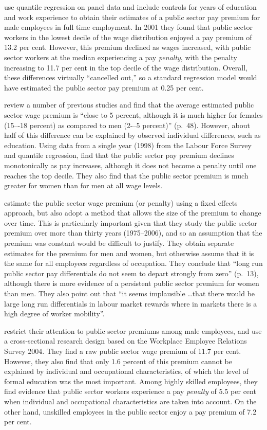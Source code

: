\documentclass[a4paper,11pt,titlepage]{article}
\begin{document}
\citet{Yu2005} use quantile regression on panel data and include controls for years of education and work experience to obtain their estimates of a public sector pay premium for male employees in full time employment.  In 2001 they found that public sector workers in the lowest decile of the wage distribution enjoyed a pay premium of 13.2 per cent.  However, this premium declined as wages increased, with public sector workers at the median experiencing a pay \emph{penalty}, with the penalty increasing to 11.7 per cent in the top decile of the wage distribution.  Overall, these differences virtually ``cancelled out,'' so a standard regression model would have estimated the public sector pay premium at 0.25 per cent.

\citet{Luciflora2006} review a number of previous studies and find that the average estimated public sector wage premium is ``close to 5 percent, although  it  is  much  higher  for  females  (15–-18  percent)  as  compared  to
men (2-–5 percent)'' (p.~48).  However, about half of this difference can be explained by observed individual differences, such as education.   Using data from a single year (1998) from the Labour Force Survey and quantile regression, \citet{Luciflora2006} find that the public sector pay premium declines monotonically as pay increases, although it does not become a penalty until one reaches the top decile.  They also find that the public sector premium is much greater for women than for men at all wage levels.

\citet{Disney2008} estimate the public sector wage premium (or penalty) using a fixed effects approach, but also adopt a method that allows the size of the premium to change over time.  This is particularly important given that they study the public sector premium over more than thirty years (1975--2006), and so an assumption that the premium was constant would be difficult to justify.  They obtain separate estimates for the premium for men and women, but otherwise assume that it is the same for all employees regardless of occupation.  They conclude that ``long run public sector pay differentials do not seem to depart strongly from zero'' (p.~13), although there is more evidence of a persistent public sector premium for women than men.  They also point out that ``it seems implausible \dots that there would be large long run differentials in labour market rewards where in markets there is a high degree of worker mobility''.

\citet{Chatterji2007} restrict their attention to public sector premiums among male employees, and use a cross-sectional research design based on the Workplace Employee Relations Survey 2004.  They find a raw public sector wage premium of 11.7 per cent.  However, they also find that only 1.6 percent of this premium cannot be explained by individual and occupational characteristics, of which the level of formal education was the most important. Among highly skilled employees, they find evidence that public sector workers experience a pay \emph{penalty} of 5.5 per cent when individual and occupational characteristics are taken into account.  On the other hand, unskilled employees in the public sector enjoy a pay premium of 7.2 per cent.
\end{document}
